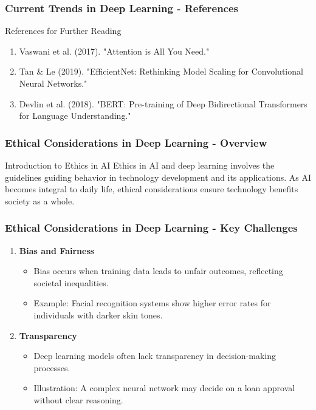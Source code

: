\documentclass[aspectratio=169]{beamer}
\begin{document}
\begin{frame}[fragile]
    \frametitle{Current Trends in Deep Learning - References}
    \begin{block}{References for Further Reading}
        \begin{enumerate}
            \item Vaswani et al. (2017). "Attention is All You Need."
            \item Tan \& Le (2019). "EfficientNet: Rethinking Model Scaling for Convolutional Neural Networks."
            \item Devlin et al. (2018). "BERT: Pre-training of Deep Bidirectional Transformers for Language Understanding."
        \end{enumerate}
    \end{block}
\end{frame}

\begin{frame}[fragile]
    \frametitle{Ethical Considerations in Deep Learning - Overview}
    \begin{block}{Introduction to Ethics in AI}
        Ethics in AI and deep learning involves the guidelines guiding behavior in technology development and its applications.
        As AI becomes integral to daily life, ethical considerations ensure technology benefits society as a whole.
    \end{block}
\end{frame}

\begin{frame}[fragile]
    \frametitle{Ethical Considerations in Deep Learning - Key Challenges}
    \begin{enumerate}
        \item \textbf{Bias and Fairness}
        \begin{itemize}
            \item Bias occurs when training data leads to unfair outcomes, reflecting societal inequalities.
            \item Example: Facial recognition systems show higher error rates for individuals with darker skin tones.
        \end{itemize}
        \item \textbf{Transparency}
        \begin{itemize}
            \item Deep learning models often lack transparency in decision-making processes.
            \item Illustration: A complex neural network may decide on a loan approval without clear reasoning.
        \end{itemize}
    \end{enumerate}
\end{frame}
\end{document}

